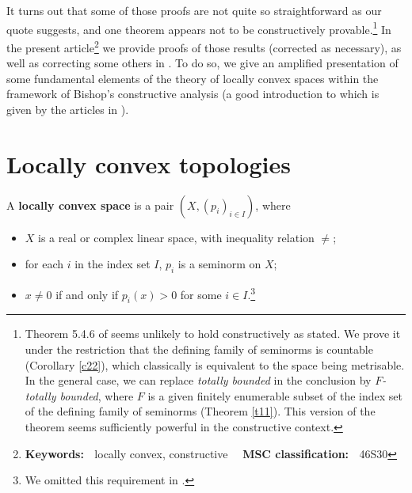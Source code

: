 \documentclass{article}%
\begin{document}
\noindent
It turns out that some of those proofs are not quite so straightforward as our
quote suggests, and one theorem appears not to be constructively
provable.\footnote{%
\normalfont\sf
Theorem 5.4.6 of \cite{BVtech} seems unlikely to hold constructively as
stated. We prove it under the restriction that the defining family of
seminorms is countable (Corollary \ref{c22}), which classically is equivalent
to the space being metrisable. In the general case, we can replace
\emph{totally bounded} in the conclusion by $F$\emph{-totally bounded}, where
$F$ is a given finitely enumerable subset of the index set of the defining
family of seminorms (Theorem \ref{t11}). This version of the theorem seems
sufficiently powerful in the constructive context.} In the present
article\footnote{%
\normalfont\sf
\textbf{Keywords: \ }locally convex, constructive \ \ \textbf{MSC
classification: \ }46S30} we provide proofs of those results (corrected as
necessary), as well as correcting some others in \cite[Section 5.4]{BVtech}.
To do so, we give an amplified presentation of some fundamental elements of
the theory of locally convex spaces within the framework of Bishop's
constructive analysis (a good introduction to which is given by the articles
\cite{Haj1,Haj2} in \cite{Handbook}).

\section{Locally convex topologies}

A \textbf{locally convex space} is a pair $\left(  X,\left(  p_{i}\right)
_{i\in I}\right)  $, where

\begin{itemize}
\item $X$ is a real or complex linear space, with inequality relation $\neq$;

\item for each $i$ in the index set $I$, $p_{i}$ is a seminorm on $X$;

\item $x\neq0$ if and only if $p_{i}(x)>0$ for some $i\in I$.\footnote{%
\normalfont\sf
We omitted this requirement in \cite[Section 5.4]{BVtech}.}
\end{itemize}
\end{document}
